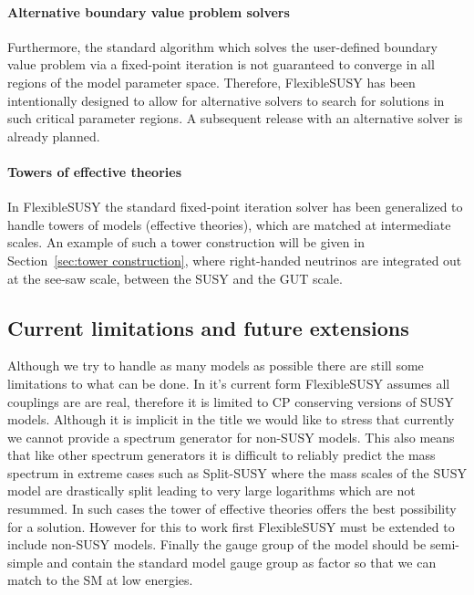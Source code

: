 \documentclass[final,3p,11pt,pdflatex]{elsarticle}
\makeatletter
\newcommand{\fs}{FlexibleSUSY\@\xspace}
\newcommand{\secref}[1]{Section~\ref{#1}}
\makeatother
\begin{document}
\paragraph{Alternative boundary value problem solvers}

Furthermore, the standard algorithm which solves the user-defined
boundary value problem via a fixed-point iteration is not guaranteed
to converge in all regions of the model parameter space.  Therefore,
\fs has been intentionally designed to allow for alternative solvers
to search for solutions in such critical parameter regions.  A
subsequent release with an alternative solver is already planned.

\paragraph{Towers of effective theories}

In \fs the standard fixed-point iteration solver has been generalized
to handle towers of models (effective theories), which are matched at
intermediate scales.  An example of such a tower construction will be
given in \secref{sec:tower construction}, where right-handed neutrinos
are integrated out at the see-saw scale, between the SUSY and the GUT
scale.

\subsection{Current limitations and future extensions}
Although we try to handle as many models as possible there are still
some limitations to what can be done. In it's current form \fs assumes
all couplings are are real, therefore it is limited to CP conserving
versions of SUSY models.   Although it is implicit in the
title we would like to stress that currently we cannot provide a
spectrum generator for non-SUSY models.  This also means that like
other spectrum generators it is difficult to reliably predict the mass
spectrum in extreme cases such as Split-SUSY
\cite{Wells:2003tf,ArkaniHamed:2004fb,Giudice:2004tc} where the mass
scales of the SUSY model are drastically split leading to very large
logarithms which are not resummed.  In such cases the tower of
effective theories offers the best possibility for a solution.
However for this to work first \fs must be extended to include
non-SUSY models.  Finally the gauge group of the model should be
semi-simple and contain the standard model gauge group as factor so
that we can match to the SM at low energies.
\end{document}
